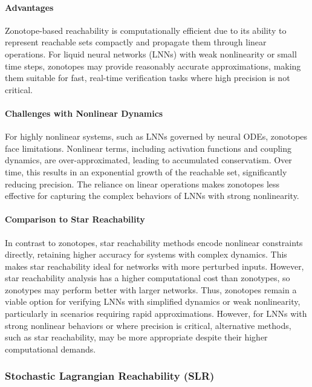 \paragraph{Advantages}
Zonotope-based reachability is computationally efficient due to its ability to represent reachable sets compactly and propagate them through linear operations. For liquid neural networks (LNNs) with weak nonlinearity or small time steps, zonotopes may provide reasonably accurate approximations, making them suitable for fast, real-time verification tasks where high precision is not critical.

\paragraph{Challenges with Nonlinear Dynamics}
For highly nonlinear systems, such as LNNs governed by neural ODEs, zonotopes face limitations. Nonlinear terms, including activation functions and coupling dynamics, are over-approximated, leading to accumulated conservatism. Over time, this results in an exponential growth of the reachable set, significantly reducing precision. The reliance on linear operations makes zonotopes less effective for capturing the complex behaviors of LNNs with strong nonlinearity.

\paragraph{Comparison to Star Reachability}
In contrast to zonotopes, star reachability methods encode nonlinear constraints directly, retaining higher accuracy for systems with complex dynamics. This makes star reachability ideal for networks with more perturbed inputs. However, star reachability analysis has a higher computational cost than zonotypes, so zonotypes may perform better with larger networks. Thus, zonotopes remain a viable option for verifying LNNs with simplified dynamics or weak nonlinearity, particularly in scenarios requiring rapid approximations. However, for LNNs with strong nonlinear behaviors or where precision is critical, alternative methods, such as star reachability, may be more appropriate despite their higher computational demands. \cite{tranVerificationPiecewiseDeep2021}

\subsubsection{Stochastic Lagrangian Reachability (SLR)}

